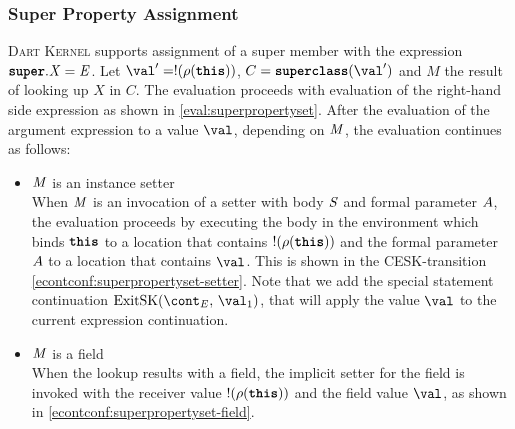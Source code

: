 \documentclass[a4paper,oneside,fleqn]{article}
\newcommand{\kernel}{\textsc{Dart Kernel}}
\newcommand{\synt}[1]{\ensuremath{\text{\textbf{\texttt{#1}}}}}
\DeclareMathOperator{\superclass}{\synt{superclass}}
\newcommand{\this}{\synt{this}}
\newcommand{\idmeta}{\ensuremath{\mathit{X}}}
\begin{document}
\subsubsection{Super Property Assignment}
\label{subsubsec:super-property-assignemnt}

\kernel{} supports assignment of a super member with the expression $\SuperPropertySet{\idmeta}{\expressionmeta}$.
Let $\val' = \deref{(\env(\this))}$, $C = \superclass(\val')$ and $M$ the result of looking up $\idmeta$ in $C$.
The evaluation proceeds with evaluation of the right-hand side expression as shown in \eqref{eval:superpropertyset}.
After the evaluation of the argument expression to a value $\val$, depending on $\mathit{M}$, the evaluation continues as follows:

\begin{itemize}
    \item $\mathit{M}$ is an instance setter\\
        When $\mathit{M}$ is an invocation of a setter with body $\mathit{S}$ and formal parameter $A$, the evaluation proceeds by executing the body in the environment which binds $\this$ to a location that contains $\deref{(\env(\this))}$ and the formal parameter $A$ to a location that contains $\val$.
        This is shown in the CESK-transition \eqref{econtconf:superpropertyset-setter}.
        Note that we add the special statement continuation $\ExitSK{\val_1}$, that will apply the value $\val$ to the current expression continuation.

    \item $\mathit{M}$ is a field\\
        When the lookup results with a field, the implicit setter for the field is invoked with the receiver value $\deref{(\env(\this))}$ and the field value $\val$, as shown in \eqref{econtconf:superpropertyset-field}.

\end{itemize}
\end{document}
